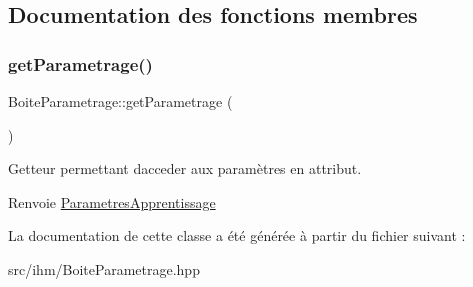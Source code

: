 \subsection{Documentation des fonctions membres}
\mbox{\label{classBoiteParametrage_ad7c3de61949e05469a73e6b8369205e2}} 
\subsubsection{\texorpdfstring{get\+Parametrage()}{getParametrage()}}
{\footnotesize\ttfamily Boite\+Parametrage\+::get\+Parametrage (\begin{DoxyParamCaption}{ }\end{DoxyParamCaption})}



Getteur permettant d\textquotesingle{}acceder aux paramètres en attribut. 

\begin{DoxyReturn}{Renvoie}
\hyperlink{classParametresApprentissage}{Parametres\+Apprentissage} 
\end{DoxyReturn}


La documentation de cette classe a été générée à partir du fichier suivant \+:\begin{DoxyCompactItemize}
\item 
src/ihm/Boite\+Parametrage.\+hpp\end{DoxyCompactItemize}

